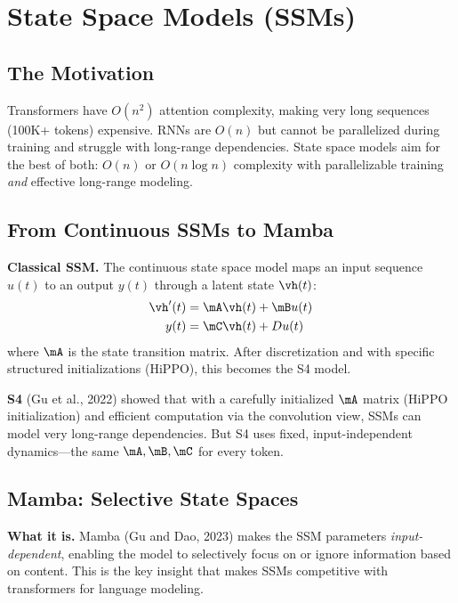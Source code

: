 \section{State Space Models (SSMs)}
\label{sec:ssms}

\subsection{The Motivation}

Transformers have $O(n^2)$ attention complexity, making very long sequences (100K+ tokens) expensive. RNNs are $O(n)$ but cannot be parallelized during training and struggle with long-range dependencies. State space models aim for the best of both: $O(n)$ or $O(n \log n)$ complexity with parallelizable training \textit{and} effective long-range modeling.

\subsection{From Continuous SSMs to Mamba}

\textbf{Classical SSM.} The continuous state space model maps an input sequence $u(t)$ to an output $y(t)$ through a latent state $\vh(t)$:
\begin{align}
\vh'(t) &= \mA\vh(t) + \mB u(t) \notag \\
y(t) &= \mC\vh(t) + D u(t) \notag
\end{align}
where $\mA$ is the state transition matrix. After discretization and with specific structured initializations (HiPPO), this becomes the S4 model.

\textbf{S4} (Gu et al., 2022) showed that with a carefully initialized $\mA$ matrix (HiPPO initialization) and efficient computation via the convolution view, SSMs can model very long-range dependencies. But S4 uses fixed, input-independent dynamics---the same $\mA, \mB, \mC$ for every token.

\subsection{Mamba: Selective State Spaces}

\textbf{What it is.} Mamba (Gu and Dao, 2023) makes the SSM parameters \textit{input-dependent}, enabling the model to selectively focus on or ignore information based on content. This is the key insight that makes SSMs competitive with transformers for language modeling.

